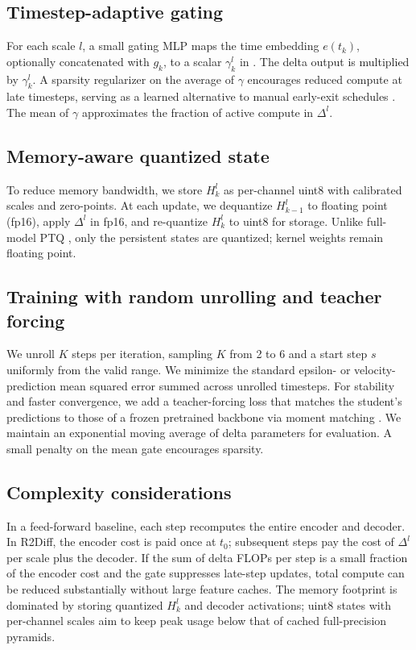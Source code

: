 \documentclass{article}
\begin{document}
\subsection{Timestep-adaptive gating}
For each scale $l$, a small gating MLP maps the time embedding $e(t_k)$, optionally concatenated with $g_k$, to a scalar $\gamma_k^l$ in . The delta output is multiplied by $\gamma_k^l$. A sparsity regularizer on the average of $\gamma$ encourages reduced compute at late timesteps, serving as a learned alternative to manual early-exit schedules \cite{moon-2024-simple}. The mean of $\gamma$ approximates the fraction of active compute in $\Delta^l$.

\subsection{Memory-aware quantized state}
To reduce memory bandwidth, we store $H_k^l$ as per-channel uint8 with calibrated scales and zero-points. At each update, we dequantize $H_{k-1}^l$ to floating point (fp16), apply $\Delta^l$ in fp16, and re-quantize $H_k^l$ to uint8 for storage. Unlike full-model PTQ \cite{shang-2022-post}, only the persistent states are quantized; kernel weights remain floating point.

\subsection{Training with random unrolling and teacher forcing}
We unroll $K$ steps per iteration, sampling $K$ from 2 to 6 and a start step $s$ uniformly from the valid range. We minimize the standard epsilon- or velocity-prediction mean squared error summed across unrolled timesteps. For stability and faster convergence, we add a teacher-forcing loss that matches the student’s predictions to those of a frozen pretrained backbone via moment matching \cite{salimans-2024-multistep}. We maintain an exponential moving average of delta parameters for evaluation. A small penalty on the mean gate encourages sparsity.

\subsection{Complexity considerations}
In a feed-forward baseline, each step recomputes the entire encoder and decoder. In R2Diff, the encoder cost is paid once at $t_0$; subsequent steps pay the cost of $\Delta^l$ per scale plus the decoder. If the sum of delta FLOPs per step is a small fraction of the encoder cost and the gate suppresses late-step updates, total compute can be reduced substantially without large feature caches. The memory footprint is dominated by storing quantized $H_k^l$ and decoder activations; uint8 states with per-channel scales aim to keep peak usage below that of cached full-precision pyramids.
\end{document}
